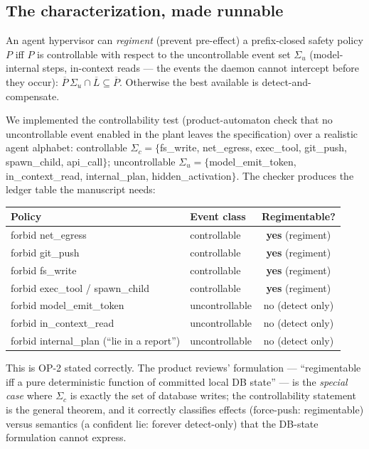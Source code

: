 \documentclass[11pt,a4paper]{article}
\begin{document}
\subsection{The characterization, made runnable}
\begin{theorem}[Regimentation $=$ controllability]
An agent hypervisor can \emph{regiment} (prevent pre-effect) a prefix-closed safety policy $P$ iff $P$ is controllable with respect to the uncontrollable event set $\Sigma_u$ (model-internal steps, in-context reads --- the events the daemon cannot intercept before they occur): $\overline{P}\,\Sigma_u\cap\overline{L}\subseteq\overline{P}$. Otherwise the best available is detect-and-compensate.
\end{theorem}
We implemented the controllability test (product-automaton check that no uncontrollable event enabled in the plant leaves the specification) over a realistic agent alphabet: controllable $\Sigma_c=\{$fs\_write, net\_egress, exec\_tool, git\_push, spawn\_child, api\_call$\}$; uncontrollable $\Sigma_u=\{$model\_emit\_token, in\_context\_read, internal\_plan, hidden\_activation$\}$. The checker produces the ledger table the manuscript needs:
\begin{center}
\begin{tabular}{@{}llc@{}}
\toprule
Policy & Event class & Regimentable? \\
\midrule
forbid net\_egress & controllable & \textbf{yes} (regiment) \\
forbid git\_push & controllable & \textbf{yes} (regiment) \\
forbid fs\_write & controllable & \textbf{yes} (regiment) \\
forbid exec\_tool / spawn\_child & controllable & \textbf{yes} (regiment) \\
forbid model\_emit\_token & uncontrollable & no (detect only) \\
forbid in\_context\_read & uncontrollable & no (detect only) \\
forbid internal\_plan (``lie in a report'') & uncontrollable & no (detect only) \\
\bottomrule
\end{tabular}
\end{center}
This is OP-2 stated correctly. The product reviews' formulation --- ``regimentable iff a pure deterministic function of committed local DB state'' --- is the \emph{special case} where $\Sigma_c$ is exactly the set of database writes; the controllability statement is the general theorem, and it correctly classifies effects (force-push: regimentable) versus semantics (a confident lie: forever detect-only) that the DB-state formulation cannot express.
\end{document}
